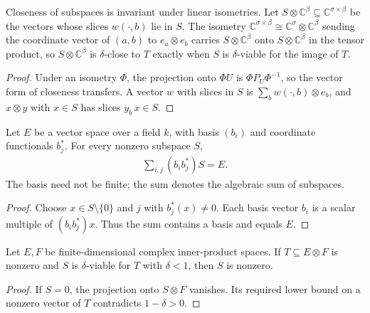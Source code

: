 \begin{theorem}
    \label{thm:viable_coordinates}
    \leanok
    Closeness of subspaces is invariant under linear isometries. Let
    $S\otimes\mathbb C^\beta\subseteq\mathbb C^{\sigma\times\beta}$ be the
    vectors whose slices $w(\cdot,b)$ lie in $S$. The isometry
    $\mathbb C^{\sigma\times\beta}\cong\mathbb C^\sigma\otimes\mathbb C^\beta$
    sending the coordinate vector of $(a,b)$ to $e_a\otimes e_b$ carries
    $S\otimes\mathbb C^\beta$ onto $S\otimes\mathbb C^\beta$ in the tensor
    product, so $S\otimes\mathbb C^\beta$ is $\delta$-close to $T$ exactly
    when $S$ is $\delta$-viable for the image of $T$.
\end{theorem}

\begin{proof}
    \leanok
    Under an isometry $\Phi$, the projection onto $\Phi U$ is $\Phi P_U\Phi^{-1}$,
    so the vector form of closeness transfers. A vector $w$ with slices in $S$
    is $\sum_b w(\cdot,b)\otimes e_b$, and $x\otimes y$ with $x\in S$ has slices
    $y_b\,x\in S$.
\end{proof}

\begin{theorem}
    \label{thm:basis_matrix_units_generate}
    \leanok
    Let $E$ be a vector space over a field $k$, with basis $(b_i)$
    and coordinate functionals $b_j^*$. For every nonzero subspace $S$,
    \begin{align}
        \sum_{i,j}(b_i b_j^*)S=E.
    \end{align}
    The basis need not be finite; the sum denotes the algebraic sum of subspaces.
\end{theorem}
\begin{proof}\leanok
    Choose $x\in S\setminus\{0\}$ and $j$ with $b_j^*(x)\ne0$.
    Each basis vector $b_i$ is a scalar multiple of $(b_i b_j^*)x$.
    Thus the sum contains a basis and equals $E$.
\end{proof}

\begin{theorem}
    \label{thm:viable_nonzero_target}
    \leanok
    Let $E,F$ be finite-dimensional complex inner-product spaces.
    If $T\subseteq E\otimes F$ is nonzero and $S$ is $\delta$-viable for $T$
    with $\delta<1$, then $S$ is nonzero.
\end{theorem}
\begin{proof}\leanok
    If $S=0$, the projection onto $S\otimes F$ vanishes. Its required lower
    bound on a nonzero vector of $T$ contradicts $1-\delta>0$.
\end{proof}


